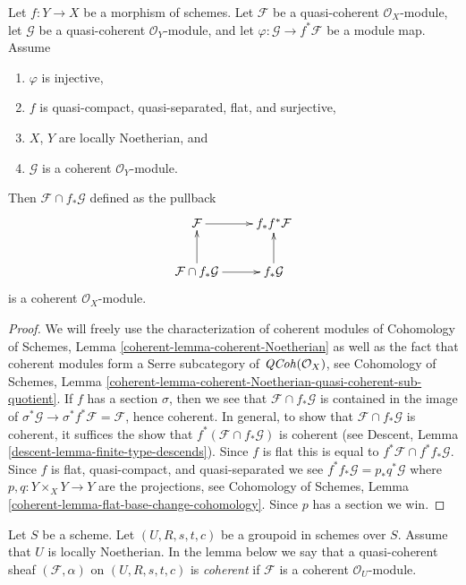 \begin{lemma}
\label{lemma-push-pull}
Let $f : Y \to X$ be a morphism of schemes. Let $\mathcal{F}$
be a quasi-coherent $\mathcal{O}_X$-module, let $\mathcal{G}$
be a quasi-coherent $\mathcal{O}_Y$-module, and let
$\varphi : \mathcal{G} \to f^*\mathcal{F}$ be a module map. Assume
\begin{enumerate}
\item $\varphi$ is injective,
\item $f$ is quasi-compact, quasi-separated, flat, and surjective,
\item $X$, $Y$ are locally Noetherian, and
\item $\mathcal{G}$ is a coherent $\mathcal{O}_Y$-module.
\end{enumerate}
Then $\mathcal{F} \cap f_*\mathcal{G}$ defined as the pullback
$$
\xymatrix{
\mathcal{F} \ar[r] & f_*f^*\mathcal{F} \\
\mathcal{F} \cap f_*\mathcal{G} \ar[u] \ar[r] &
f_*\mathcal{G} \ar[u]
}
$$
is a coherent $\mathcal{O}_X$-module.
\end{lemma}

\begin{proof}
We will freely use the characterization of coherent modules of
Cohomology of Schemes, Lemma \ref{coherent-lemma-coherent-Noetherian}
as well as the fact that coherent modules form a Serre subcategory
of $\mathit{QCoh}(\mathcal{O}_X)$, see
Cohomology of Schemes,
Lemma \ref{coherent-lemma-coherent-Noetherian-quasi-coherent-sub-quotient}.
If $f$ has a section $\sigma$, then we see that
$\mathcal{F} \cap f_*\mathcal{G}$ is contained in the image of
$\sigma^*\mathcal{G} \to \sigma^*f^*\mathcal{F} = \mathcal{F}$,
hence coherent. In general, to show that $\mathcal{F} \cap f_*\mathcal{G}$
is coherent, it suffices the show that
$f^*(\mathcal{F} \cap f_*\mathcal{G})$ is coherent (see
Descent, Lemma \ref{descent-lemma-finite-type-descends}).
Since $f$ is flat this is equal to $f^*\mathcal{F} \cap f^*f_*\mathcal{G}$.
Since $f$ is flat, quasi-compact, and quasi-separated we see
$f^*f_*\mathcal{G} = p_*q^*\mathcal{G}$ where $p, q : Y \times_X Y \to Y$
are the projections, see
Cohomology of Schemes, Lemma \ref{coherent-lemma-flat-base-change-cohomology}.
Since $p$ has a section we win.
\end{proof}

\noindent
Let $S$ be a scheme. Let $(U, R, s, t, c)$ be a groupoid in schemes over $S$.
Assume that $U$ is locally Noetherian. In the lemma below we say that a
quasi-coherent sheaf $(\mathcal{F}, \alpha)$ on $(U, R, s, t, c)$ is
{\it coherent} if $\mathcal{F}$ is a coherent $\mathcal{O}_U$-module.

